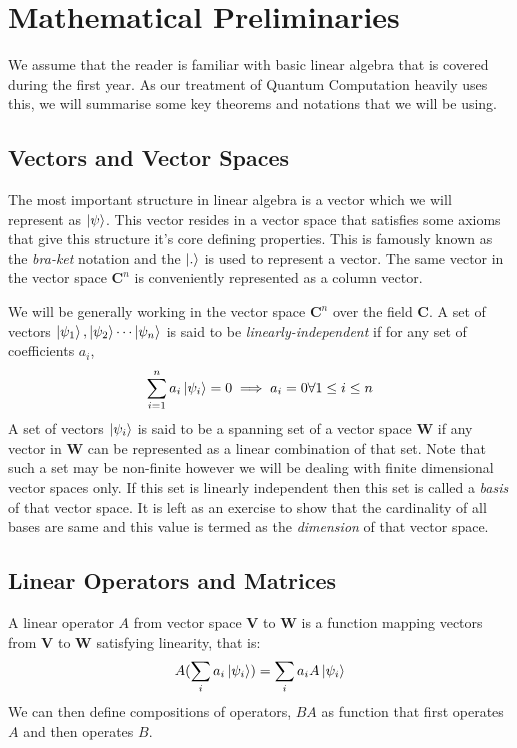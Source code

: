 \section{Mathematical Preliminaries}

We assume that the reader is familiar with basic linear algebra that is covered during the first year. As our treatment of Quantum Computation heavily uses this, we will summarise some key theorems and notations that we will be using.

\subsection{Vectors and Vector Spaces}
The most important structure in linear algebra is a vector which we will represent as $\ket{\psi}$. This vector resides in a vector space that satisfies some axioms that give this structure it's core defining properties. This is famously known as the \textit{bra-ket} notation and the $\ket{.}$ is used to represent a vector. The same vector in the vector space $\mathbf{C}^{n}$ is conveniently represented as a column vector.

We will be generally working in the vector space $\mathbf{C}^{n}$ over the field $\mathbf{C}$.
A set of vectors $\ket{\psi_{1}}, \ket{\psi_{2}} \cdots \ket{\psi_{n}}$ is said to be \textit{linearly-independent} if for any set of coefficients ${a_i}$, 
$$\sum_{i=1}^{n} a_i\ket{\psi_{i}} = 0 \implies a_i = 0   \forall   1 \leq i \leq n$$
A set of vectors ${\ket{\psi_{i}}}$ is said to be a spanning set of a vector space $\textbf{W}$ if any vector in $\textbf{W}$ can be represented as a linear combination of that set. Note that such a set may be non-finite however we will be dealing with finite dimensional vector spaces only. If this set is linearly independent then this set is called a \textit{basis} of that vector space. It is left as an exercise to show that the cardinality of all bases are same and this value is termed as the \textit{dimension} of that vector space.

\subsection{Linear Operators and Matrices}
A linear operator $A$ from vector space \textbf{V} to \textbf{W} is a function mapping vectors from \textbf{V} to \textbf{W} satisfying linearity, that is:
$$ A(\sum_{i} a_i \ket{\psi_{i}}) = \sum_{i} a_{i}A\ket{\psi_{i}} $$ 
We can then define compositions of operators, $BA$ as function that first operates $A$ and then operates $B$. 


